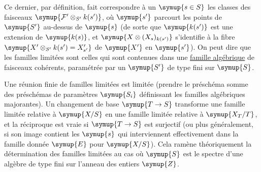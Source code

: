 Ce dernier, par définition, fait correspondre à un $\symup{s\in S}$ les classes des
faisceaux $\symup{\mathcal F'\otimes_{S'}k(s')}$, où $\symup{s'}$ parcourt les points de $\symup{S'}$
au-dessus de $\symup{s}$ (de sorte que $\symup{k(s')}$ est une extension de $\symup{k(s)}$, et
$\symup{X\otimes(X_s)_{k(s')}}$ s'identifie à la fibre
$\symup{X'\otimes_{S'}k(s')=X'_{s'}}$ de $\symup{X'}$ en $\symup{s'}$). On peut dire que les familles
limitées sont celles qui sont contenues dans une \uline{famille algébrique} de
faisceaux cohérents, paramétrée par un $\symup{S'}$ de type fini sur $\symup{S}$.

Une réunion finie de familles limitées est limitée (prendre le préschéma somme
des préschémas de paramètres $\symup{S_i}$ définissant les familles algébriques
majorantes). Un changement de base $\symup{T\to S}$ transforme une famille
limitée relative à $\symup{X/S}$ en une famille limitée relative à $\symup{X_T/T}$, et la
réciproque est vraie si $\symup{T\to S}$ est surjectif (ou plus
généralement, si son image contient les $\symup{s}$ qui interviennent effectivement
dans la famille donnée $\symup{E}$ pour $\symup{X/S}$). Cela ramène théoriquement la
détermination des familles limitées au cas où $\symup{S}$ est le spectre d'une algèbre
de type fini sur l'anneau des entiers $\symup{Z}$.

